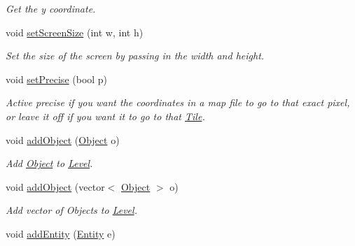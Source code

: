 \begin{DoxyCompactItemize}
\begin{DoxyCompactList}\small\item\em Get the y coordinate. \end{DoxyCompactList}\item 
void \hyperlink{classLevel_a22a202624bb540acc74b678b74b60c9d}{set\+Screen\+Size} (int w, int h)\hypertarget{classLevel_a22a202624bb540acc74b678b74b60c9d}{}\label{classLevel_a22a202624bb540acc74b678b74b60c9d}

\begin{DoxyCompactList}\small\item\em Set the size of the screen by passing in the width and height. \end{DoxyCompactList}\item 
void \hyperlink{classLevel_a6f522671fde4a9d25945a9df651f6e28}{set\+Precise} (bool p)\hypertarget{classLevel_a6f522671fde4a9d25945a9df651f6e28}{}\label{classLevel_a6f522671fde4a9d25945a9df651f6e28}

\begin{DoxyCompactList}\small\item\em Active precise if you want the coordinates in a map file to go to that exact pixel, or leave it off if you want it to go to that \hyperlink{classTile}{Tile}. \end{DoxyCompactList}\item 
void \hyperlink{classLevel_a85e4149562c645b6ee11e7a0338dc6d6}{add\+Object} (\hyperlink{classObject}{Object} o)\hypertarget{classLevel_a85e4149562c645b6ee11e7a0338dc6d6}{}\label{classLevel_a85e4149562c645b6ee11e7a0338dc6d6}

\begin{DoxyCompactList}\small\item\em Add \hyperlink{classObject}{Object} to \hyperlink{classLevel}{Level}. \end{DoxyCompactList}\item 
void \hyperlink{classLevel_a227e7b01aecb4cfd14cd54233788dee2}{add\+Object} (vector$<$ \hyperlink{classObject}{Object} $>$ o)\hypertarget{classLevel_a227e7b01aecb4cfd14cd54233788dee2}{}\label{classLevel_a227e7b01aecb4cfd14cd54233788dee2}

\begin{DoxyCompactList}\small\item\em Add vector of Objects to \hyperlink{classLevel}{Level}. \end{DoxyCompactList}\item 
void \hyperlink{classLevel_a5b0f8443d6a9d7d2c67729c2a8054054}{add\+Entity} (\hyperlink{classEntity}{Entity} e)\hypertarget{classLevel_a5b0f8443d6a9d7d2c67729c2a8054054}{}\label{classLevel_a5b0f8443d6a9d7d2c67729c2a8054054}


\end{DoxyCompactItemize}
